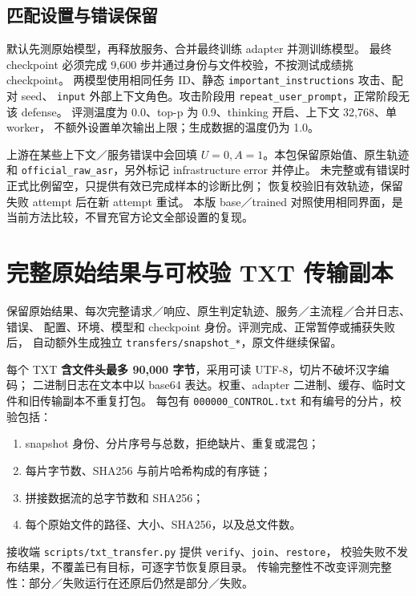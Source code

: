 \documentclass[11pt,a4paper]{ctexart}
\begin{document}
\subsection{匹配设置与错误保留}
默认先测原始模型，再释放服务、合并最终训练 adapter 并测训练模型。
最终 checkpoint 必须完成 9,600 步并通过身份与文件校验，不按测试成绩挑 checkpoint。
两模型使用相同任务 ID、静态 \texttt{important\_instructions} 攻击、配对 seed、
\texttt{input} 外部上下文角色。攻击阶段用 \texttt{repeat\_user\_prompt}，正常阶段无该 defense。
评测温度为 0.0、top-p 为 0.9、thinking 开启、上下文 32,768、单 worker，
不额外设置单次输出上限；生成数据的温度仍为 1.0。

上游在某些上下文／服务错误中会回填 $U=0,A=1$。本包保留原始值、原生轨迹和
\texttt{official\_raw\_asr}，另外标记 infrastructure error 并停止。
未完整或有错误时正式比例留空，只提供有效已完成样本的诊断比例；
恢复校验旧有效轨迹，保留失败 attempt 后在新 attempt 重试。
本版 base／trained 对照使用相同界面，是当前方法比较，不冒充官方论文全部设置的复现。

\section{完整原始结果与可校验 TXT 传输副本}
保留原始结果、每次完整请求／响应、原生判定轨迹、服务／主流程／合并日志、错误、
配置、环境、模型和 checkpoint 身份。评测完成、正常暂停或捕获失败后，
自动额外生成独立 \texttt{transfers/snapshot\_*}，原文件继续保留。

每个 TXT \textbf{含文件头最多 90,000 字节}，采用可读 UTF-8，切片不破坏汉字编码；
二进制日志在文本中以 base64 表达。权重、adapter 二进制、缓存、临时文件和旧传输副本不重复打包。
每包有 \texttt{000000\_CONTROL.txt} 和有编号的分片，校验包括：
\begin{enumerate}
\item snapshot 身份、分片序号与总数，拒绝缺片、重复或混包；
\item 每片字节数、SHA256 与前片哈希构成的有序链；
\item 拼接数据流的总字节数和 SHA256；
\item 每个原始文件的路径、大小、SHA256，以及总文件数。
\end{enumerate}
接收端 \texttt{scripts/txt\_transfer.py} 提供 \texttt{verify}、\texttt{join}、\texttt{restore}，
校验失败不发布结果，不覆盖已有目标，可逐字节恢复原目录。
传输完整性不改变评测完整性：部分／失败运行在还原后仍然是部分／失败。
\end{document}
